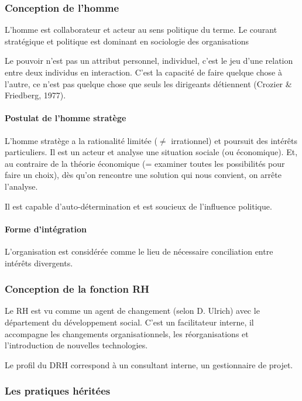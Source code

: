 \documentclass[12pt]{article}
\begin{document}
	
	\subsubsection{Conception de l'homme}
	L'homme est collaborateur et acteur au sens politique du terme. Le courant stratégique et politique est dominant en sociologie des organisations
	
	Le pouvoir n'est pas un attribut personnel, individuel, c'est le jeu d'une relation entre deux individus en interaction. C'est la capacité de faire quelque chose à l'autre, ce n'est pas quelque chose que seuls les dirigeants détiennent (Crozier \& Friedberg, 1977).
	
	\paragraph{Postulat de l'homme stratège} L'homme stratège a la rationalité limitée ($\neq$ irrationnel) et poursuit des intérêts particuliers. Il est un acteur et analyse une situation sociale (ou économique). Et, au contraire de la théorie économique (= examiner toutes les possibilités pour faire un choix), dès qu'on rencontre une \og{} solution\fg{} qui nous convient, on arrête l'analyse.
	
	Il est capable d'auto-détermination et est soucieux de l'influence politique.
	
	\paragraph{Forme d'intégration} L'organisation est considérée comme le lieu de nécessaire conciliation entre intérêts divergents.
	
	\subsubsection{Conception de la fonction RH}

	Le RH est vu comme un \og{} agent de changement\fg{} (selon D. Ulrich) avec le département du développement social. C’est un facilitateur interne, il accompagne les changements organisationnels, les réorganisations et l’introduction de nouvelles technologies.
	
	Le profil du DRH correspond à un consultant interne, un gestionnaire de projet.
	
	\subsubsection{Les pratiques héritées}
	
\end{document}
